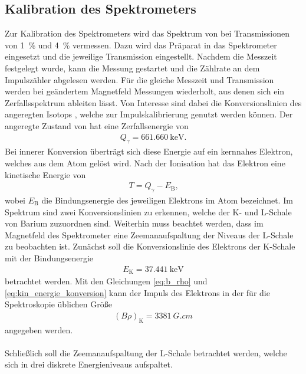 \documentclass[11pt, a4paper]{article}
\numberwithin{equation}{section}
\begin{document}
\subsection{Kalibration des Spektrometers}
\label{ssec:kalibration}
Zur Kalibration des Spektrometers wird das Spektrum von  bei Transmissionen von \SI{1}{\percent} und \SI{4}{\percent} vermessen.
Dazu wird das Präparat in das Spektrometer eingesetzt und die jeweilige Transmission eingestellt.
Nachdem die Messzeit festgelegt wurde, kann die Messung gestartet und die Zählrate an dem Impulszähler abgelesen werden.
Für die gleiche Messzeit und Transmission werden bei geändertem Magnetfeld Messungen wiederholt, aus denen sich ein Zerfallsspektrum ableiten lässt.
Von Interesse sind dabei die Konversionslinien des angeregten Isotops , welche zur Impulskalibrierung genutzt werden können.
Der angeregte Zustand von  hat eine Zerfallsenergie von
\begin{align*}
	Q_\gamma = \SI{661,660}{\kilo\electronvolt}\text{.}
\end{align*}
Bei innerer Konversion überträgt sich diese Energie auf ein kernnahes Elektron, welches aus dem Atom gelöst wird.
Nach der Ionisation hat das Elektron eine kinetische Energie von
\begin{align}
	T = Q_\gamma - E_\mathrm{B} \text{,}
	\label{eq:kin_energie_konversion}
\end{align}
wobei $E_\mathrm{B}$ die Bindungsenergie des jeweiligen Elektrons im Atom bezeichnet.
Im Spektrum sind zwei Konversionslinien zu erkennen, welche der K- und L-Schale von Barium zuzuordnen sind.
Weiterhin muss beachtet werden, dass im Magnetfeld des Spektrometer eine Zeemanaufspaltung der Niveaus der L-Schale zu beobachten ist.
Zunächst soll die Konversionslinie des Elektrons der K-Schale mit der Bindungsenergie
\begin{align*}
E_\mathrm{K} = \SI{37,441}{\kilo\electronvolt}
\end{align*}
betrachtet werden.
Mit den Gleichungen \eqref{eq:b_rho} und \eqref{eq:kin_energie_konversion} kann der Impuls des Elektrons in der für die Spektroskopie üblichen Größe
\begin{align*}
	\left(B \rho \right)_\mathrm{K} = \SI{3381}{G.cm}
\end{align*}
angegeben werden.
\\
\\
Schließlich soll die Zeemanaufspaltung der L-Schale betrachtet werden, welche sich in drei diskrete Energieniveaus aufspaltet.
\end{document}
